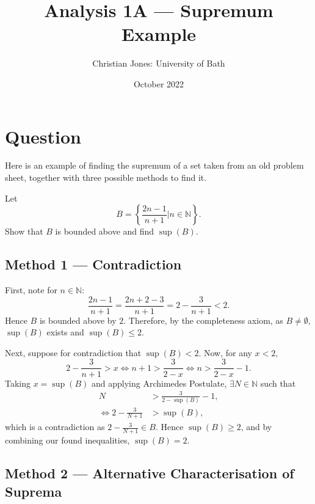 \documentclass[
  17pt,
  a4paper]{extarticle}
\title{Analysis 1A --- Supremum Example}
\author{Christian Jones: University of Bath}
\date{October 2022}
\theoremstyle{plain}
\theoremstyle{definition}
\theoremstyle{plain}
\theoremstyle{plain}
\theoremstyle{plain}
\theoremstyle{plain}
\theoremstyle{definition}
\theoremstyle{definition}
\newtheorem*{Order Axioms*}{Order Axioms}\newtheorem{Order Axioms}{Order Axioms}[section]
\theoremstyle{remark}
\theoremstyle{remark}
\let\BeginKnitrBlock\begin \let\EndKnitrBlock\end
\renewcommand{\;}{\,}
\begin{document}
\maketitle

{
\setcounter{tocdepth}{2}
\tableofcontents
}
\newpage
{}

\hypertarget{question}{%
\section*{Question}\label{question}}

Here is an example of finding the supremum of a set taken from an old problem sheet, together with three possible methods to find it.
\BeginKnitrBlock{example}
{\label{exm:unnamed-chunk-2} }Let \[B = \left\lbrace \frac{2n-1}{n+1} \lvert n \in \mathbb{N}\right\rbrace.\] Show that \(B\) is bounded above and find \(\sup(B).\)
\EndKnitrBlock{example}

\hypertarget{method-1-contradiction}{%
\subsection*{Method 1 --- Contradiction}\label{method-1-contradiction}}

\BeginKnitrBlock{solution*}
First, note for \(n\in\mathbb{N}\): \[\frac{2n-1}{n+1} = \frac{2n+2-3}{n+1} = 2 - \frac{3}{n+1} < 2.\] Hence \(B\) is bounded above by \(2\). Therefore, by the completeness axiom, as \(B \neq \emptyset,\) \(\sup(B)\) exists and \(\sup(B) \leq 2.\)

Next, suppose for contradiction that \(\sup(B) < 2\). Now, for any \(x < 2,\) \[2 - \frac{3}{n+1} > x \Leftrightarrow n+1 > \frac{3}{2-x} \Leftrightarrow n > \frac{3}{2-x} - 1.\] Taking \(x = \sup(B)\) and applying Archimedes Postulate, \(\exists N \in \mathbb{N}\) such that
\begin{align*}
N &> \frac{3}{2-\sup(B)} - 1,\\
\Leftrightarrow 2 - \frac{3}{N+1} &> \sup(B),
\end{align*}
which is a contradiction as \(2 - \frac{3}{N+1} \in B.\) Hence \(\sup(B) \geq 2\), and by combining our found inequalities, \(\sup(B)=2\).
\EndKnitrBlock{solution*}

\hypertarget{method-2-alternative-characterisation-of-suprema}{%
\subsection*{Method 2 --- Alternative Characterisation of Suprema}\label{method-2-alternative-characterisation-of-suprema}}
\end{document}
